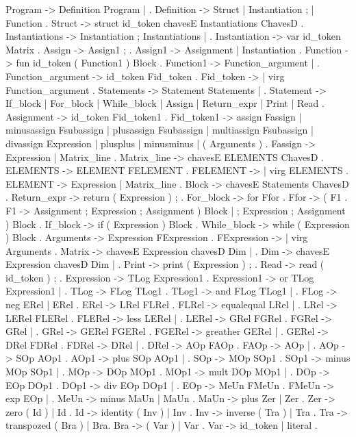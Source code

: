 Program -> Definition Program | .
Definition -> Struct | Instantiation ; | Function .
Struct -> struct id_token chavesE Instantiations ChavesD .
Instantiations -> Instantiation ; Instantiations | .
Instantiation -> var id_token Matrix .
Assign -> Assign1 ; .
Assign1 -> Assignment | Instantiation .
Function -> fun id_token ( Function1 ) Block .
Function1 -> Function_argument | .
Function_argument -> id_token Fid_token .
Fid_token -> | virg Function_argument .
Statements -> Statement Statements | .
Statement -> If_block | For_block | While_block | Assign | Return_expr | Print | Read .
Assignment -> id_token Fid_token1 .
Fid_token1 -> assign Fassign | minusassign Fsubassign | plusassign Fsubassign | multiassign Fsubassign | divassign Expression | plusplus | minusminus | ( Arguments ) .
Fassign -> Expression | Matrix_line .
Matrix_line -> chavesE ELEMENTS ChavesD .
ELEMENTS -> ELEMENT FELEMENT .
FELEMENT -> | virg ELEMENTS .
ELEMENT -> Expression | Matrix_line .
Block -> chavesE Statements ChavesD .
Return_expr -> return ( Expression ) ; .
For_block -> for Ffor .
Ffor -> ( F1 .
F1 -> Assignment ; Expression ; Assignment ) Block | ; Expression ; Assignment ) Block .
If_block -> if ( Expression ) Block .
While_block -> while ( Expression ) Block .
Arguments -> Expression FExpression .
FExpression -> | virg Arguments .
Matrix -> chavesE Expression chavesD Dim | .
Dim -> chavesE Expression chavesD Dim | .
Print -> print ( Expression ) ; .
Read -> read ( id_token ) ; .
Expression -> TLog Expression1 .
Expression1 -> or TLog Expression1 | .
TLog -> FLog TLog1 .
TLog1 -> and FLog TLog1 | .
FLog -> neg ERel | ERel .
ERel -> LRel FLRel .
FLRel -> equalequal LRel | .
LRel -> LERel FLERel .
FLERel -> less LERel | .
LERel -> GRel FGRel .
FGRel -> \leq GRel | .
GRel -> GERel FGERel .
FGERel -> greather GERel | .
GERel -> DRel FDRel .
FDRel -> \geq DRel | .
DRel -> AOp FAOp .
FAOp -> \neq AOp | .
AOp -> SOp AOp1 .
AOp1 -> plus SOp AOp1 | .
SOp -> MOp SOp1 .
SOp1 -> minus MOp SOp1 | .
MOp -> DOp MOp1 .
MOp1 -> mult DOp MOp1 | .
DOp -> EOp DOp1 .
DOp1 -> div EOp DOp1 | .
EOp -> MeUn FMeUn .
FMeUn -> exp EOp | .
MeUn -> minus MaUn | MaUn .
MaUn -> plus Zer | Zer .
Zer -> zero ( Id ) | Id .
Id -> identity ( Inv ) | Inv .
Inv -> inverse ( Tra ) | Tra .
Tra -> transpozed ( Bra ) | Bra.
Bra -> ( Var ) | Var .
Var -> id_token | literal .